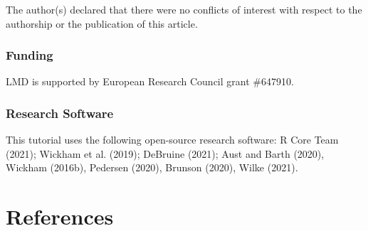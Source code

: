 \documentclass[
  english,
  doc,floatsintext]{apa6}
\begin{document}
The author(s) declared that there were no conflicts of interest with respect to the authorship or the publication of this article.

\hypertarget{funding}{%
\subsubsection{Funding}\label{funding}}

LMD is supported by European Research Council grant \#647910.

\hypertarget{research-software}{%
\subsubsection{Research Software}\label{research-software}}

This tutorial uses the following open-source research software: R Core Team (2021); Wickham et al. (2019); DeBruine (2021); Aust and Barth (2020), Wickham (2016b), Pedersen (2020), Brunson (2020), Wilke (2021).

\newpage

\hypertarget{references}{%
\section{References}\label{references}}

\begingroup
\setlength{\parindent}{-0.5in}
\setlength{\leftskip}{0.5in}
\end{document}
